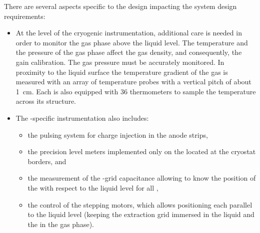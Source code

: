 There are several aspects specific to the \dual design impacting the  system design requirements:
\begin{itemize}
\item At the level of the cryogenic instrumentation, additional care is needed in order to monitor the gas phase above the liquid level. The temperature and the pressure of the gas phase affect the gas density, and consequently, the  gain calibration. The gas pressure must be accurately monitored. In proximity to the liquid surface the temperature gradient of the gas %
is measured with an array of temperature probes with a vertical pitch of about \SI{1}{cm}. Each  is also equipped with \num{36} thermometers to sample the temperature across its structure.

\item The -specific instrumentation also includes: 

\begin{itemize}
\item the pulsing system for charge injection in the anode strips,
\item the precision level meters implemented only on the  located at the cryostat borders, and 
\item the measurement of the -grid capacitance allowing to know  the position of the  with respect to the liquid level for all , 
\item the control of the stepping motors,  which allows positioning each  parallel to the liquid level (keeping the extraction grid immersed in the liquid and the  in the gas phase).
\end{itemize}


\end{itemize}
